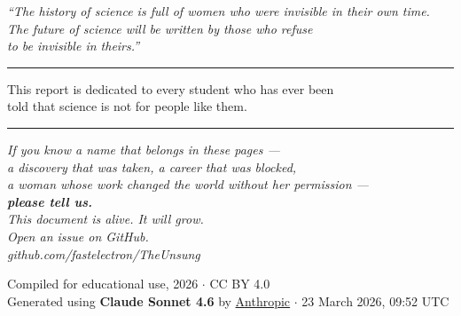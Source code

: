 \documentclass[12pt,a4paper]{article}
\begin{document}
\vspace{10pt}

\newpage
\pagecolor{deepplum}
\color{white}
\thispagestyle{empty}
\vspace*{3cm}
\begin{center}

{\color{goldhigh}\large\itshape ``The history of science is full of women who were invisible in their own time.}\\[0.5cm]
{\color{goldhigh}\large\itshape The future of science will be written by those who refuse}\\[0.3cm]
{\color{goldhigh}\large\itshape to be invisible in theirs.''}

\vspace{1.5cm}
{\color{medgray}\rule{10cm}{0.4pt}}
\vspace{1cm}

{\large This report is dedicated to every student who has ever been\\[0.3cm]
told that science is not for people like them.}

\vspace{1.5cm}
{\color{medgray}\rule{10cm}{0.4pt}}
\vspace{1cm}

\begin{minipage}{0.82\textwidth}
\centering
{\color{softplum}\itshape
If you know a name that belongs in these pages ---\\[0.4cm]
a discovery that was taken, a career that was blocked,\\
a woman whose work changed the world without her permission ---\\[0.6cm]
{\color{goldhigh}\bfseries\large please tell us.}\\[0.6cm]
This document is alive. It will grow.\\[0.4cm]
Open an issue on GitHub.\\[0.3cm]
{\footnotesize\color{medgray}github.com/fastelectron/TheUnsung}
}
\end{minipage}

\vspace{1.5cm}
{\color{medgray}\footnotesize Compiled for educational use, 2026 $\cdot$ CC BY 4.0}\\[5pt]
{\color{softplum!70}\footnotesize Generated using \textbf{Claude Sonnet 4.6} by \href{https://www.anthropic.com}{\color{goldhigh}Anthropic} $\cdot$ 23 March 2026, 09:52 UTC}

\end{center}
\end{document}
